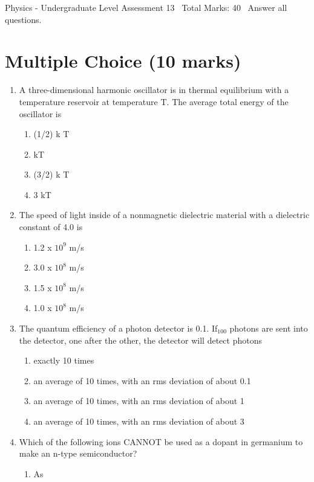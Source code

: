\documentclass[12pt]{article}
\begin{document}
\begin{center}
Physics - Undergraduate Level Assessment 13 \
Total Marks: 40 \
Answer all questions.
\end{center}

\section*{Multiple Choice (10 marks)}
\begin{enumerate}[label=\arabic*.]
\item A three-dimensional harmonic oscillator is in thermal equilibrium with a temperature reservoir at temperature T. The average total energy of the oscillator is
\begin{enumerate}[label=(\alph*)]
    \item (1/2) k T
    \item kT
    \item (3/2) k T
    \item 3 kT
\end{enumerate}
\item The speed of light inside of a nonmagnetic dielectric material with a dielectric constant of 4.0 is
\begin{enumerate}[label=(\alph*)]
    \item 1.2 x $10^9$ m/s
    \item 3.0 x $10^8$ m/s
    \item 1.5 x $10^8$ m/s
    \item 1.0 x $10^8$ m/s
\end{enumerate}
\item The quantum efficiency of a photon detector is 0.1. If$_{100}$ photons are sent into the detector, one after the other, the detector will detect photons
\begin{enumerate}[label=(\alph*)]
    \item exactly 10 times
    \item an average of 10 times, with an rms deviation of about 0.1
    \item an average of 10 times, with an rms deviation of about 1
    \item an average of 10 times, with an rms deviation of about 3
\end{enumerate}
\item Which of the following ions CANNOT be used as a dopant in germanium to make an n-type semiconductor?
\begin{enumerate}[label=(\alph*)]
    \item As

\end{enumerate}
\end{enumerate}
\end{document}
